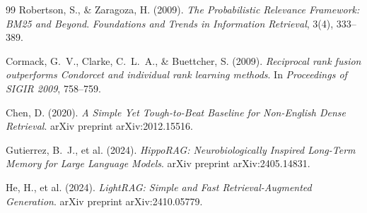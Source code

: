 \documentclass[12pt,a4paper]{report}
\theoremstyle{plain}
\theoremstyle{definition}
\begin{document}
\begin{thebibliography}{99}
		Robertson, S., \& Zaragoza, H. (2009).
		\textit{The Probabilistic Relevance Framework: BM25 and Beyond}.
		\textit{Foundations and Trends in Information Retrieval}, 3(4), 333--389.
		
		Cormack, G.~V., Clarke, C.~L.~A., \& Buettcher, S. (2009).
		\textit{Reciprocal rank fusion outperforms Condorcet and individual rank learning methods}.
		In \textit{Proceedings of SIGIR 2009}, 758--759.
		
		Chen, D. (2020).
		\textit{A Simple Yet Tough-to-Beat Baseline for Non-English Dense Retrieval}.
		arXiv preprint arXiv:2012.15516.
		
		Gutierrez, B.~J., et al. (2024).
		\textit{HippoRAG: Neurobiologically Inspired Long-Term Memory for Large Language Models}.
		arXiv preprint arXiv:2405.14831.
		
		He, H., et al. (2024).
		\textit{LightRAG: Simple and Fast Retrieval-Augmented Generation}.
		arXiv preprint arXiv:2410.05779.
		
	\end{thebibliography}
	
\end{document}
